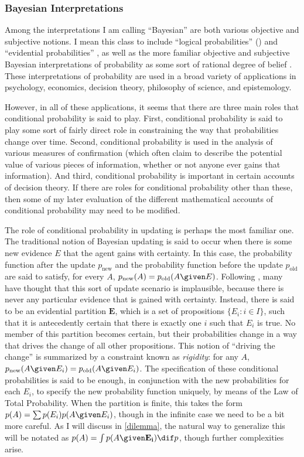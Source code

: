 \subsubsection{Bayesian Interpretations}

Among the interpretations I am calling ``Bayesian'' are both various objective and subjective notions. I mean this class to include ``logical probabilities'' (\citet{keynes, carnapprob, maherconception}) and ``evidential probabilities'' \citep{kail}, as well as the more familiar objective and subjective Bayesian interpretations of probability as some sort of rational degree of belief \citep{bayes1, bayes2}. These interpretations of probability are used in a broad variety of applications in psychology, economics, decision theory, philosophy of science, and epistemology.

However, in all of these applications, it seems that there are three main roles that conditional probability is said to play. First, conditional probability is said to play some sort of fairly direct role in constraining the way that probabilities change over time. Second, conditional probability is used in the analysis of various measures of confirmation (which often claim to describe the potential value of various pieces of information, whether or not anyone ever gains that information). And third, conditional probability is important in certain accounts of decision theory. If there are roles for conditional probability other than these, then some of my later evaluation of the different mathematical accounts of conditional probability may need to be modified.

The role of conditional probability in updating is perhaps the most familiar one. The traditional notion of Bayesian updating is said to occur when there is some new evidence $E$ that the agent gains with certainty. In this case, the probability function after the update $p_{\text{new}}$ and the probability function before the update $p_{\text{old}}$ are said to satisfy, for every $A$, $p_{\text{new}}(A)=p_{\text{old}}(A \given E)$. Following \citet{jeffrey}, many have thought that this sort of update scenario is implausible, because there is never any particular evidence that is gained with certainty. Instead, there is said to be an evidential partition $\mathbf{E}$, which is a set of propositions $\{E_i\colon i\in I\}$, such that it is antecedently certain that there is exactly one $i$ such that $E_i$ is true. No member of this partition becomes certain, but their probabilities change in a way that drives the change of all other propositions. This notion of ``driving the change'' is summarized by a constraint known as \textit{rigidity}: for any $A$, $p_{\text{new}}(A \given E_i)=p_{\text{old}}(A \given E_i)$. The specification of these conditional probabilities is said to be enough, in conjunction with the new probabilities for each $E_i$, to specify the new probability function uniquely, by means of the Law of Total Probability. When the partition is finite, this takes the form $p(A)=\sum p(E_i)p(A \given E_i)$, though in the infinite case we need to be a bit more careful. As I will discuss in \autoref{dilemma}, the natural way to generalize this will be notated as $p(A)=\int p(A \given \mathbf{E_i}) \dif p$, though further complexities arise.

